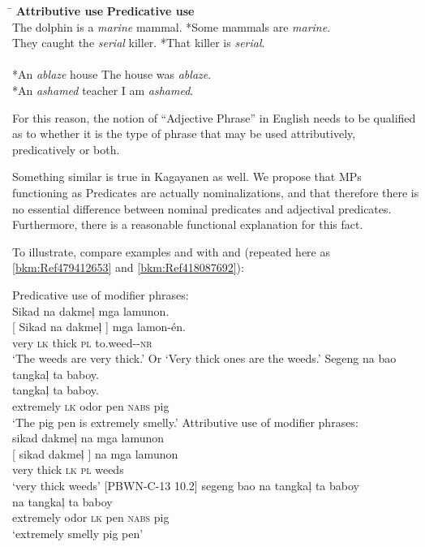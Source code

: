 \ea
\begin{tabbing}
\hspace{5.5cm} \= \kill   
\textbf{Attributive use}    \>    \textbf{Predicative use} \\
The dolphin is a \textit{marine} mammal. \> *Some mammals are \textit{marine}. \\
They caught the \textit{serial} killer.   \>   *That killer is \textit{serial}. \\ \\
*An \textit{ablaze} house   \>   The house was \textit{ablaze}. \\
*An \textit{ashamed} teacher  \>    I am \textit{ashamed}.
\end{tabbing}
\z

For this reason, the notion of “Adjective Phrase” in English needs to be qualified as to whether it is the type of phrase that may be used attributively, predicatively or both.

Something similar is true in Kagayanen as well. We propose that MPs functioning as Predicates are actually nominalizations, and that therefore there is no essential difference between nominal predicates and adjectival predicates. Furthermore, there is a reasonable functional explanation for this fact.

To illustrate, compare examples  and  with  and  (repeated here as \ref{bkm:Ref479412653} and \ref{bkm:Ref418087692}):

\ea
\label{bkm:Ref417997171}\label{bkm:Ref418088532}
Predicative use of modifier phrases: \\
Sikad  na  dakmeļ  mga  lamunon. \\\smallskip
 \gll {}[ Sikad  na  dakmeļ ]  mga  lamon-én. \\
 {} very  \textsc{lk}  thick {} \textsc{pl}  to.weed-\textsc-\textsc{nr} \\
\glt ‘The weeds are very thick.’ Or ‘Very thick ones are the weeds.’
\z
\ea
\label{bkm:Ref113343326}
Segeng  na  bao    tangkaļ  ta  baboy. \\\smallskip
   tangkaļ  ta  baboy. \\
 {} extremely  \textsc{lk}  odor {} pen  \textsc{nabs}  pig \\
\glt ‘The pig pen is extremely smelly.’
\z
\ea
\label{bkm:Ref418087690}\label{bkm:Ref479412653}
Attributive use of modifier phrases: \\
sikad  dakmeļ na  mga  lamunon \\\smallskip
 \gll {}[ sikad  dakmeļ ]  na  mga  lamunon \\
 {} very  thick {} \textsc{lk}  \textsc{pl}  weeds \\
\glt ‘very thick weeds’ [PBWN-C-13 10.2]
\z
\ea
\label{bkm:Ref418087692}
segeng  bao   na  tangkaļ  ta  baboy \\\smallskip
   na  tangkaļ  ta  baboy \\
{} extremely  odor {} \textsc{lk}  pen  \textsc{nabs}  pig \\
\glt ‘extremely smelly pig pen’
\z

